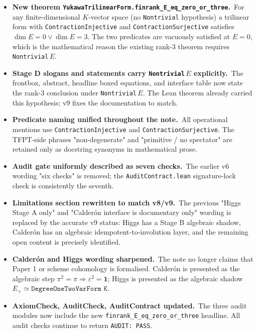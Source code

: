 \documentclass[11pt,a4paper]{article}
\begin{document}
\begin{itemize}[leftmargin=1.6em, itemsep=2pt]
\item \textbf{New theorem
    \texttt{YukawaTrilinearForm.finrank\_E\_eq\_zero\_or\_three}.}\
    For any finite-dimensional $K$-vector space (no
    \texttt{Nontrivial} hypothesis) a trilinear form with
    \texttt{ContractionInjective} and
    \texttt{ContractionSurjective} satisfies
    $\dim E = 0 \lor \dim E = 3$. The two predicates are
    vacuously satisfied at $E = 0$, which is the mathematical
    reason the existing rank-3 theorem requires
    \texttt{Nontrivial}\,$E$.

\item \textbf{Stage D slogans and statements carry
    \texttt{Nontrivial}\,$E$ explicitly.}\ The frontbox,
    abstract, headline boxed equations, and interface table now
    state the rank-3 conclusion under \texttt{Nontrivial}\,$E$.
    The Lean theorem already carried this hypothesis; v9 fixes
    the documentation to match.

\item \textbf{Predicate naming unified throughout the note.}\
    All operational mentions use \texttt{ContractionInjective}
    and \texttt{ContractionSurjective}. The TFPT-side phrases
    "non-degenerate" and "primitive / no spectator" are
    retained only as docstring synonyms in mathematical prose.

\item \textbf{Audit gate uniformly described as seven checks.}\
    The earlier v6 wording "six checks" is removed; the
    \texttt{AuditContract.lean} signature-lock check is
    consistently the seventh.

\item \textbf{Limitations section rewritten to match v8/v9.}\
    The previous "Higgs Stage A only" and "Calder\'on interface
    is documentary only" wording is replaced by the accurate v9
    status: Higgs has a Stage B algebraic shadow, Calder\'on has
    an algebraic idempotent-to-involution layer, and the
    remaining open content is precisely identified.

\item \textbf{Calder\'on and Higgs wording sharpened.}\ The note
    no longer claims that Paper 1 or scheme cohomology is
    formalised. Calder\'on is presented as the algebraic step
    $\pi^2 = \pi \Rightarrow \varepsilon^2 = \mathbf 1$; Higgs is
    presented as the algebraic shadow $E_+ \simeq
    \texttt{DegreeOneTwoVarForm K}$.

\item \textbf{AxiomCheck, AuditCheck, AuditContract updated.}\
    The three audit modules now include the new
    \texttt{finrank\_E\_eq\_zero\_or\_three} headline. All
    audit checks continue to return \texttt{AUDIT:\ PASS}.
\end{itemize}
\end{document}
